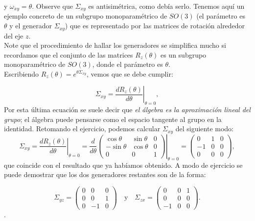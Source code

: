 y $\omega_{x y}=\theta$. Observe que $\Sigma_{x y}$ es antisimétrica, como debía serlo. Tenemos aquí un ejemplo concreto de un subgrupo monoparamétrico de $S O(3)$ (el parámetro es $\theta$ y el generador $\Sigma_{x y}$) que es representado por las matrices de rotación alrededor del eje $z$. \\

Note que el procedimiento de hallar los generadores se simplifica mucho si recordamos que el conjunto de las matrices $R_{z}(\theta)$ es un subgrupo monoparamétrico de $S O(3)$, donde el parámetro es $\theta$. \\

Escribiendo $R_{z}(\theta)=e^{\theta \Sigma_{x y}}$, vemos que se debe cumplir:

\begin{equation}
\Sigma_{x y}=\left.\frac{d R_{z}(\theta)}{d \theta}\right|_{\theta=0},
\end{equation}
Por esta última ecuación se suele decir que \emph{el álgebra es la aproximación lineal del grupo}; el álgebra puede pensarse como el espacio tangente al grupo en la identidad. Retomando el ejercicio, podemos calcular $\Sigma_{x y}$ del siguiente modo:
\begin{equation}
\Sigma_{x y}=\left.\frac{d R_{z}(\theta)}{d \theta}\right|_{\theta=0}=\left.\frac{d}{d \theta}\left(\begin{array}{ccc}
\cos \theta & \sin \theta & 0 \\
-\sin \theta & \cos \theta & 0 \\
0 & 0 & 1
\end{array}\right)\right|_{\theta=0}=\left(\begin{array}{ccc}
0 & 1 & 0 \\
-1 & 0 & 0 \\
0 & 0 & 0
\end{array}\right),
\label{eqA_18}
\end{equation}
que coincide con el resultado que ya habíamos obtenido. A modo de ejercicio se puede demostrar que los dos generadores restantes son de la forma:

\begin{equation}
\Sigma_{y z}=\left(\begin{array}{ccc}
0 & 0 & 0 \\
0 & 0 & 1 \\
0 & -1 & 0
\end{array}\right) \quad \mathrm{y} \quad \Sigma_{z x}=\left(\begin{array}{ccc}
0 & 0 & 1 \\
0 & 0 & 0 \\
-1 & 0 & 0
\end{array}\right).
\label{eqA_19}
\end{equation}.


